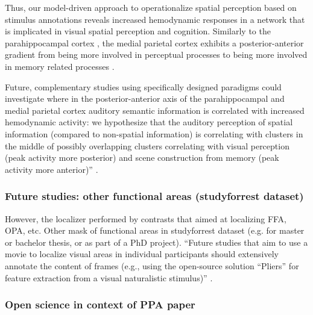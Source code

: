 Thus, our model-driven approach to operationalize spatial perception based on
stimulus annotations reveals increased hemodynamic responses in a network that
is implicated in visual spatial perception and cognition.
Similarly to the parahippocampal cortex \citep{aminoff2013role}, the medial
parietal cortex exhibits a posterior-anterior gradient from being more involved
in perceptual processes to being more involved in memory related processes
\citep{chrastil2018heterogeneity, hassabis2009construction, silson2019posterior,
steel2021network}.

Future, complementary studies using specifically designed paradigms could
investigate where in the posterior-anterior axis of the parahippocampal and
medial parietal cortex auditory semantic information is correlated with
increased hemodynamic activity:
we hypothesize that the auditory perception of spatial information (compared to
non-spatial information) is correlating with clusters in the middle of possibly
overlapping clusters correlating with visual perception (peak activity more
posterior) and scene construction from memory (peak activity more anterior)''
\citep{haeusler2022processing}.

\subsubsection{Future studies: other functional areas (studyforrest dataset)}



%
However, the localizer performed by \citep{sengupta2016extension} contrasts
that aimed at localizing FFA, OPA, etc.
%
Other mask of functional areas in studyforrest dataset (e.g. for master or
bachelor thesis, or as part of a PhD project).
%
``Future studies that aim to use a movie to localize visual areas in individual
participants should extensively annotate the content of frames (e.g., using the
open-source solution ``Pliers''\citep{mcnamara2017developing} for feature
extraction from a visual naturalistic stimulus)''
\citep{haeusler2022processing}.




\subsubsection{Open science in context of PPA paper}


